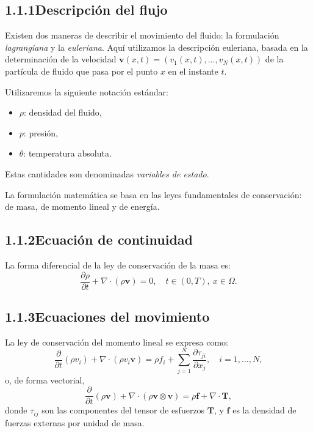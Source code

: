 \documentclass[12pt,a4paper]{article}
\begin{document}
\subsection*{1.1.1\quad Descripción del flujo}

Existen dos maneras de describir el movimiento del fluido: la formulación \textit{lagrangiana} y la \textit{euleriana}. Aquí utilizamos la descripción euleriana, basada en la determinación de la velocidad $\mathbf{v}(x,t) = (v_1(x,t), \ldots, v_N(x,t))$ de la partícula de fluido que pasa por el punto $x$ en el instante $t$.

Utilizaremos la siguiente notación estándar:
\begin{itemize}
  \item $\rho$: densidad del fluido,
  \item $p$: presión,
  \item $\theta$: temperatura absoluta.
\end{itemize}
Estas cantidades son denominadas \textit{variables de estado}.

La formulación matemática se basa en las leyes fundamentales de conservación: de masa, de momento lineal y de energía.

\subsection*{1.1.2\quad Ecuación de continuidad}

La forma diferencial de la ley de conservación de la masa es:
\begin{equation}
\frac{\partial \rho}{\partial t} + \nabla \cdot (\rho \mathbf{v}) = 0, \quad t \in (0,T),\ x \in \Omega.
\end{equation}

\subsection*{1.1.3\quad Ecuaciones del movimiento}

La ley de conservación del momento lineal se expresa como:
\begin{equation}
\frac{\partial}{\partial t}(\rho v_i) + \nabla \cdot (\rho v_i \mathbf{v}) = \rho f_i + \sum_{j=1}^N \frac{\partial \tau_{ji}}{\partial x_j}, \quad i = 1,\ldots,N,
\end{equation}
o, de forma vectorial,
\begin{equation}
\frac{\partial}{\partial t}(\rho \mathbf{v}) + \nabla \cdot (\rho \mathbf{v} \otimes \mathbf{v}) = \rho \mathbf{f} + \nabla \cdot \mathbf{T},
\end{equation}
donde $\tau_{ij}$ son las componentes del tensor de esfuerzos $\mathbf{T}$, y $\mathbf{f}$ es la densidad de fuerzas externas por unidad de masa.
\end{document}
